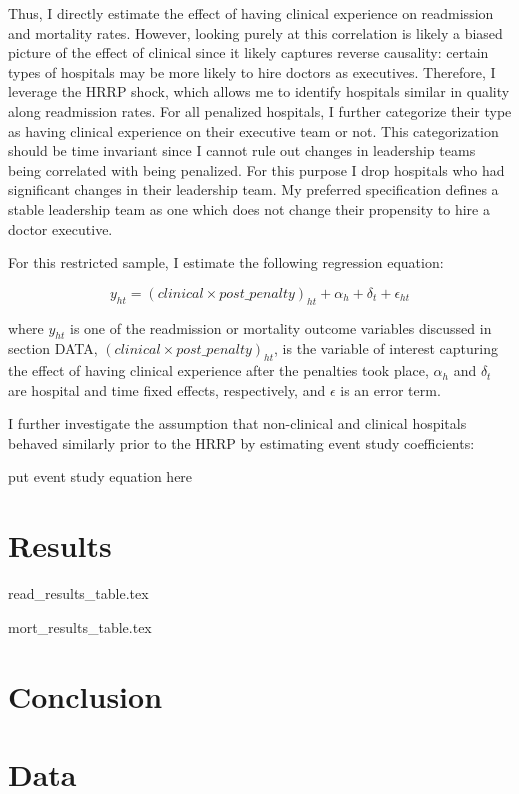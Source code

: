 \documentclass[12pt]{article}
\begin{document}
    Thus, I directly estimate the effect of having clinical experience on readmission and mortality rates. However, looking purely at this correlation is likely a biased picture of the effect of clinical since it likely captures reverse causality: certain types of hospitals may be more likely to hire doctors as executives. Therefore, I leverage the HRRP shock, which allows me to identify hospitals similar in quality along readmission rates. For all penalized hospitals, I further categorize their type as having clinical experience on their executive team or not. This categorization should be time invariant since I cannot rule out changes in leadership teams being correlated with being penalized. For this purpose I drop hospitals who had significant changes in their leadership team. My preferred specification defines a stable leadership team as one which does not change their propensity to hire a doctor executive. 

    For this restricted sample, I estimate the following regression equation:

    $$y_{ht} = (clinical \times post\_penalty)_{ht} + \alpha_{h} + \delta_t + \epsilon_{ht}$$

    \noindent where $y_{ht}$ is one of the readmission or mortality outcome variables discussed in section DATA, $(clinical \times post\_penalty)_{ht}$, is the variable of interest capturing the effect of having clinical experience after the penalties took place, $\alpha_h$ and $\delta_t$ are hospital and time fixed effects, respectively, and $\epsilon$ is an error term. 

    I further investigate the assumption that non-clinical and clinical hospitals behaved similarly prior to the HRRP by estimating event study coefficients:

    put event study equation here

    \section{Results}

    {read_results_table.tex}

    {mort_results_table.tex}

    \section{Conclusion}

	
	\newpage
	\appendix

    \section{Data}\label{appendixdata}
\end{document}
